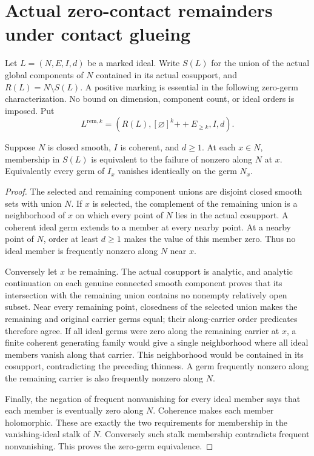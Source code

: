 \section{Actual zero-contact remainders under contact glueing}

Let $L=(N,E,I,d)$ be a marked ideal. Write $S(L)$ for the union of the
actual global components of $N$ contained in its actual cosupport, and
$R(L)=N\setminus S(L)$. A positive marking is essential in the following
zero-germ characterization. No bound on dimension, component count, or ideal
orders is imposed. Put
\[
 L^{\mathrm{rem},k}=(R(L),[\varnothing]^k\mathbin{+\!+}E_{\geq k},I,d).
\]

\begin{theorem}
\label{hir:zero-contact-selected-zero-germ}
\leanok
{}
Suppose $N$ is closed smooth, $I$ is coherent, and $d\geq1$. At each
$x\in N$, membership in $S(L)$ is equivalent to the failure of nonzero
along $N$ at $x$. Equivalently every germ of $I_x$ vanishes identically
on the germ $N_x$.
\end{theorem}
\begin{proof}
The selected and remaining component unions are disjoint closed smooth
sets with union $N$. If $x$ is selected, the complement of the remaining
union is a neighborhood of $x$ on which every point of $N$ lies in the
actual cosupport. A coherent ideal germ extends to a member at every
nearby point. At a nearby point of $N$, order at least $d\geq1$ makes
the value of this member zero. Thus no ideal member is frequently nonzero
along $N$ near $x$.

Conversely let $x$ be remaining. The actual cosupport is analytic, and
analytic continuation on each genuine connected smooth component proves
that its intersection with the remaining union contains no nonempty
relatively open subset. Near every remaining point, closedness of the
selected union makes the remaining and original carrier germs equal;
their along-carrier order predicates therefore agree. If all ideal germs
were zero along the remaining carrier at $x$, a finite coherent generating
family would give a single neighborhood where all ideal members vanish
along that carrier. This neighborhood would be contained in its cosupport,
contradicting the preceding thinness. A germ frequently nonzero along the
remaining carrier is also frequently nonzero along $N$.

Finally, the negation of frequent nonvanishing for every ideal member says
that each member is eventually zero along $N$. Coherence makes each member
holomorphic. These are exactly the two requirements for membership in the
vanishing-ideal stalk of $N$. Conversely such stalk membership contradicts
frequent nonvanishing. This proves the zero-germ equivalence.
\end{proof}

